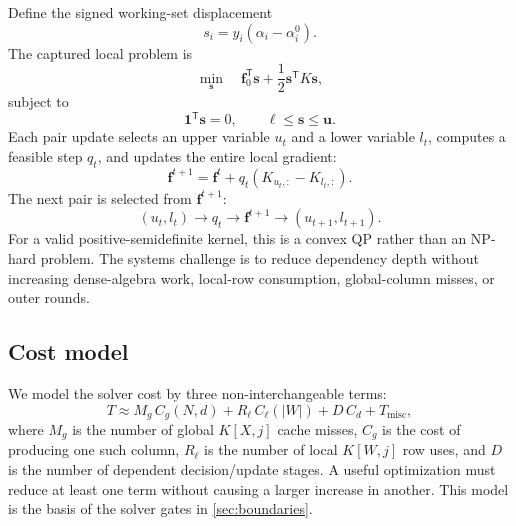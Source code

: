 Define the signed working-set displacement
\begin{equation}
  s_i=y_i(\alpha_i-\alpha_i^0).
\end{equation}
The captured local problem is
\begin{equation}
  \min_{\bm{s}}
  \quad
  \bm{f}_0^{\mathsf T}\bm{s}
  +\frac{1}{2}\bm{s}^{\mathsf T}K\bm{s},
  \label{eq:local-qp}
\end{equation}
subject to
\begin{equation}
  \bm{1}^{\mathsf T}\bm{s}=0,
  \qquad
  \bm{\ell}\leq\bm{s}\leq\bm{u}.
\end{equation}
Each pair update selects an upper variable $u_t$ and a lower variable $l_t$,
computes a feasible step $q_t$, and updates the entire local gradient:
\begin{equation}
  \bm{f}^{t+1}
  =\bm{f}^{t}
  +q_t\left(K_{u_t,:}-K_{l_t,:}\right).
  \label{eq:pair-update}
\end{equation}
The next pair is selected from $\bm{f}^{t+1}$:
\begin{equation}
  (u_t,l_t)\rightarrow q_t\rightarrow \bm{f}^{t+1}
  \rightarrow (u_{t+1},l_{t+1}).
  \label{eq:serial-chain}
\end{equation}
For a valid positive-semidefinite kernel, this is a convex QP rather than an
NP-hard problem. The systems challenge is to reduce dependency depth without
increasing dense-algebra work, local-row consumption, global-column misses, or
outer rounds.

\subsection{Cost model}

We model the solver cost by three non-interchangeable terms:
\begin{equation}
  T \approx
  M_g\,C_g(N,d)
  + R_\ell\,C_\ell(|W|)
  + D\,C_d
  + T_{\mathrm{misc}},
  \label{eq:cost-model}
\end{equation}
where $M_g$ is the number of global $K[X,j]$ cache misses, $C_g$ is the cost
of producing one such column, $R_\ell$ is the number of local $K[W,j]$ row
uses, and $D$ is the number of dependent decision/update stages. A useful
optimization must reduce at least one term without causing a larger increase
in another. This model is the basis of the solver gates in
\cref{sec:boundaries}.

